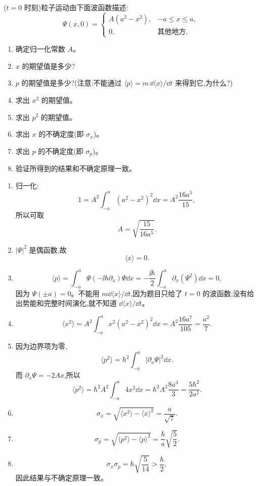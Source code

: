 \begin{question}
($t=0$ 时刻)粒子运动由下面波函数描述:
\[
\Psi(x,0)=
\begin{cases}
A(a^2-x^2), & -a\le x\le a,\\
0, & \text{其他地方}.
\end{cases}
\]
\begin{enumerate}
\item 确定归一化常数 $A$。
\item $x$ 的期望值是多少?
\item $p$ 的期望值是多少?(注意:不能通过 $\langle p\rangle=m\,\dd\langle x\rangle/\dd t$ 来得到它,为什么?)
\item 求出 $x^2$ 的期望值。
\item 求出 $p^2$ 的期望值。
\item 求出 $x$ 的不确定度(即 $\sigma_x$)。
\item 求出 $p$ 的不确定度(即 $\sigma_p$)。
\item 验证所得到的结果和不确定原理一致。
\end{enumerate}
\end{question}
\begin{solution}
\begin{enumerate}
\item 归一化:
\[
1=A^2\int_{-a}^{a}(a^2-x^2)^2\dd x
=A^2\frac{16a^5}{15},
\]
所以可取
\[
A=\sqrt{\frac{15}{16a^5}}.
\]
\item $|\Psi|^2$ 是偶函数,故
\[
\langle x\rangle=0.
\]
\item
\[
\langle p\rangle=\int_{-a}^a\Psi(-\ii\hbar\partial_x)\Psi\dd x
=-\frac{\ii\hbar}{2}\int_{-a}^a\partial_x(\Psi^2)\dd x=0,
\]
因为 $\Psi(\pm a)=0$。不能用 $m\dd\langle x\rangle/\dd t$,因为题目只给了 $t=0$ 的波函数;没有给出势能和完整时间演化,就不知道 $\dd\langle x\rangle/\dd t$。
\item
\[
\langle x^2\rangle=A^2\int_{-a}^{a}x^2(a^2-x^2)^2\dd x
=A^2\frac{16a^7}{105}=\frac{a^2}{7}.
\]
\item 因为边界项为零,
\[
\langle p^2\rangle=\hbar^2\int_{-a}^{a}|\partial_x\Psi|^2\dd x.
\]
而 $\partial_x\Psi=-2Ax$,所以
\[
\langle p^2\rangle=\hbar^2 A^2\int_{-a}^{a}4x^2\dd x
=\hbar^2A^2\frac{8a^3}{3}=\frac{5\hbar^2}{2a^2}.
\]
\item
\[
\sigma_x=\sqrt{\langle x^2\rangle-\langle x\rangle^2}=\frac{a}{\sqrt7}.
\]
\item
\[
\sigma_p=\sqrt{\langle p^2\rangle-\langle p\rangle^2}=\frac{\hbar}{a}\sqrt{\frac52}.
\]
\item
\[
\sigma_x\sigma_p=\hbar\sqrt{\frac{5}{14}}>\frac{\hbar}{2},
\]
因此结果与不确定原理一致。
\end{enumerate}
\end{solution}

